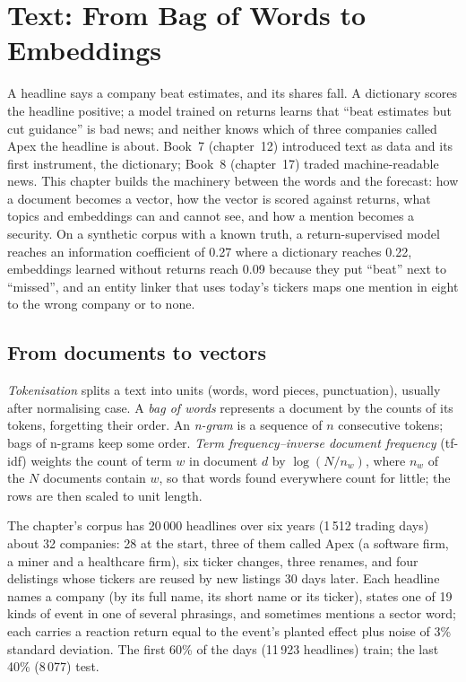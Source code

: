 \chapter{Text: From Bag of Words to Embeddings}\label{ch:ml:text-from-bag-of-words-to-embeddings}

A headline says a company beat estimates, and its shares fall. A dictionary scores the headline positive; a model
trained on returns learns that ``beat estimates but cut guidance'' is bad news; and neither knows which of three companies
called Apex the headline is about. Book~7 (chapter~12) introduced text as data and its first instrument, the dictionary;
Book~8 (chapter~17) traded machine-readable news. This chapter builds the machinery between the words and the forecast:
how a document becomes a vector, how the vector is scored against returns, what topics and embeddings can and cannot
see, and how a mention becomes a security. On a synthetic corpus with a known truth, a return-supervised model reaches
an information coefficient of 0.27 where a dictionary reaches 0.22, embeddings learned without returns reach 0.09 because
they put ``beat'' next to ``missed'', and an entity linker that uses today's tickers maps one mention in eight to the
wrong company or to none.

\section{From documents to vectors}

\begin{definition}\label{def:ml:text-from-bag-of-words-to-embeddings:bow}
\emph{Tokenisation} splits a text into units (words, word pieces, punctuation), usually after
normalising case. A \emph{bag of words} represents a document by the counts of its tokens, forgetting
their order. An \emph{n-gram} is a sequence of $n$ consecutive tokens; bags of n-grams keep some order.
\emph{Term frequency--inverse document frequency} (tf-idf) weights the count
of term $w$ in document $d$ by $\log(N/n_w)$, where $n_w$ of the $N$ documents contain $w$, so that words found everywhere
count for little; the rows are then scaled to unit length.
\end{definition}

The chapter's corpus has 20\,000 headlines over six years (1\,512 trading days) about 32 companies: 28 at the start,
three of them called Apex (a software firm, a miner and a healthcare firm), six ticker changes, three renames, and four
delistings whose tickers are reused by new listings 30 days later. Each headline names a company (by its full name, its
short name or its ticker), states one of 19 kinds of event in one of several phrasings, and sometimes mentions a sector
word; each carries a reaction return equal to the event's planted effect plus noise of 3\% standard deviation. The first
60\% of the days (11\,923 headlines) train; the last 40\% (8\,077) test.

